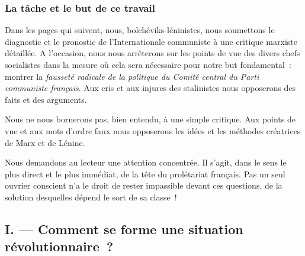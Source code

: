 \documentclass[french,twoside]{book} %
\begin{document}
 \subsubsection[{La tâche et le but de ce travail}]{La tâche et le but de ce travail}
\noindent Dans les pages qui suivent, nous, bolchéviks-léninistes, nous soumettons le diagnostic et le pronostic de l’Internationale communiste à une critique marxiste détaillée. A l’occasion, nous nous arrêterons sur les points de vue des divers chefs socialistes dans la mesure où cela sera nécessaire pour notre but fondamental : montrer la \emph{fausseté radicale de la politique du Comité central du Parti communiste français}. Aux cris et aux injures des stalinistes nous opposerons des faits et des arguments.\par
Nous ne nous bornerons pas, bien entendu, à une simple critique. Aux points de vue et aux mots d’ordre faux nous opposerons les idées et les méthodes créatrices de Marx et de Lénine.\par
Nous demandons au lecteur une attention concentrée. Il s’agit, dans le sens le plus direct et le plus immédiat, de la tête du prolétariat français. Pas un seul ouvrier conscient n’a le droit de rester impassible devant ces questions, de la solution desquelles dépend le sort de sa classe !
\subsection[{I. — Comment se forme une situation révolutionnaire ?}]{I. — Comment se forme une situation révolutionnaire ?}
\end{document}
